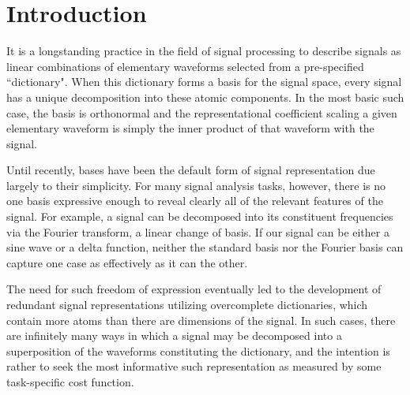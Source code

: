 \chapter{Introduction}\label{Intro}




It is a longstanding practice in the field of signal processing to describe signals as linear combinations of elementary waveforms selected from a pre-specified ``dictionary". When this dictionary forms a basis for the signal space, every signal has a unique decomposition into these atomic components. In the most basic such case, the basis is orthonormal and the representational coefficient scaling a given elementary waveform is simply the inner product of that waveform with the signal. %

Until recently, bases have been the default form of signal representation due largely to their simplicity. For many signal analysis tasks, however, there is no one basis expressive enough to reveal clearly all of the relevant features of the signal. For example, a signal can be decomposed into its constituent frequencies via the Fourier transform, a linear change of basis. If our signal can be either a sine wave or a delta function, neither the standard basis nor the Fourier basis can capture one case as effectively as it can the other. 

The need for such freedom of expression eventually led to the development of redundant signal representations utilizing overcomplete dictionaries, which contain more atoms than there are dimensions of the signal. In such cases, there are infinitely many ways in which a signal may be decomposed into a superposition of the waveforms constituting the dictionary, and the intention is rather to seek the most informative such representation as measured by some task-specific cost function. 

